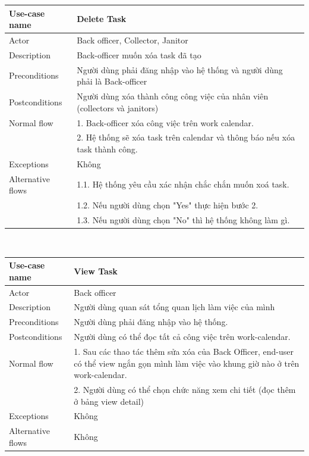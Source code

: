 \documentclass[a4paper]{article}
\begin{document}
\begin{enumerate}
\begin{tabular}{|p{3cm}|p{10cm}|}
     \hline
     Use-case name & Delete Task \\
     \hline
     Actor & Back officer, Collector, Janitor\\
     \hline
     Description & Back-officer muốn xóa task đã tạo \\
     \hline
     Preconditions & Người dùng phải đăng nhập vào hệ thống và người dùng phải là Back-officer\\
               \hline
     Postconditions & Người dùng xóa thành công công việc của nhân viên (collectors và janitors) \\
     \hline
     Normal flow & 1. Back-officer xóa công việc trên work calendar. \\
     & 2. Hệ thống sẽ xóa task trên calendar và thông báo nếu xóa task thành công. \\
     \hline
     Exceptions & Không\\
     \hline
     Alternative flows & 1.1. Hệ thống yêu cầu xác nhận chắc chắn muốn xoá task.\\
     & 1.2. Nếu người dùng chọn "Yes" thực hiện bước 2.\\
     & 1.3. Nếu người dùng chọn "No" thì hệ thống không làm gì.\\
     \hline
\end{tabular}
\vspace{0.5cm}\\
\begin{tabular}{|p{3cm}|p{10cm}|}
     \hline
     Use-case name & View Task \\
     \hline
     Actor & Back officer\\
     \hline
     Description & Người dùng quan sát tổng quan lịch làm việc của mình \\
     \hline
     Preconditions & Người dùng phải đăng nhập vào hệ thống.\\
               \hline
     Postconditions & Người dùng có thể đọc tất cả công việc trên work-calendar.\\
     \hline
     Normal flow & 1. Sau các thao tác thêm sửa xóa của Back Officer, end-user có thể view ngắn gọn mình làm việc vào khung giờ nào ở trên work-calendar. \\
     & 2. Người dùng có thể chọn chức năng xem chi tiết (đọc thêm ở bảng view detail) \\
     \hline
     Exceptions & Không\\
     \hline
     Alternative flows & Không\\
     \hline
\end{tabular}





\end{enumerate}
\end{document}
